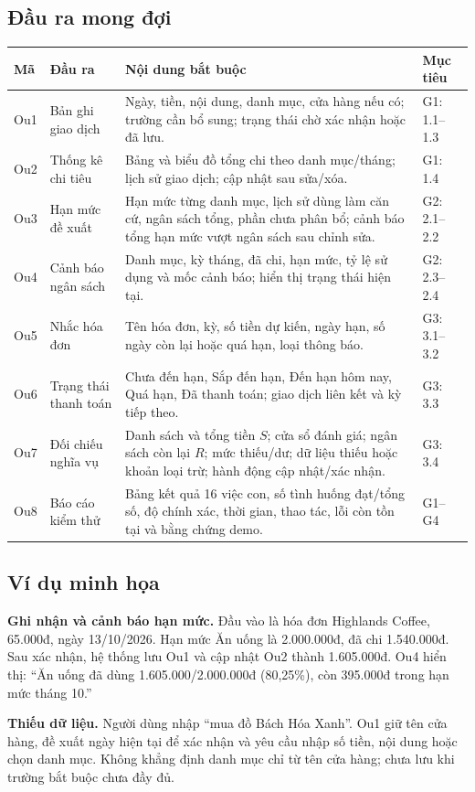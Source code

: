 \documentclass[11pt,a4paper]{article}
\newcommand{\thead}[1]{\rowcolor{tablehead}#1\\\midrule}
\begin{document}
\subsection{Đầu ra mong đợi}
\begin{longtable}{@{}P{.85cm}P{3.1cm}P{8.3cm}P{2.85cm}@{}}
\toprule\thead{\textbf{Mã}&\textbf{Đầu ra}&\textbf{Nội dung bắt buộc}&\textbf{Mục tiêu}}
\endhead
Ou1&Bản ghi giao dịch&Ngày, tiền, nội dung, danh mục, cửa hàng nếu có; trường cần bổ sung; trạng thái chờ xác nhận hoặc đã lưu.&G1: 1.1--1.3\\\midrule
Ou2&Thống kê chi tiêu&Bảng và biểu đồ tổng chi theo danh mục/tháng; lịch sử giao dịch; cập nhật sau sửa/xóa.&G1: 1.4\\\midrule
Ou3&Hạn mức đề xuất&Hạn mức từng danh mục, lịch sử dùng làm căn cứ, ngân sách tổng, phần chưa phân bổ; cảnh báo tổng hạn mức vượt ngân sách sau chỉnh sửa.&G2: 2.1--2.2\\\midrule
Ou4&Cảnh báo ngân sách&Danh mục, kỳ tháng, đã chi, hạn mức, tỷ lệ sử dụng và mốc cảnh báo; hiển thị trạng thái hiện tại.&G2: 2.3--2.4\\\midrule
Ou5&Nhắc hóa đơn&Tên hóa đơn, kỳ, số tiền dự kiến, ngày hạn, số ngày còn lại hoặc quá hạn, loại thông báo.&G3: 3.1--3.2\\\midrule
Ou6&Trạng thái thanh toán&Chưa đến hạn, Sắp đến hạn, Đến hạn hôm nay, Quá hạn, Đã thanh toán; giao dịch liên kết và kỳ tiếp theo.&G3: 3.3\\\midrule
Ou7&Đối chiếu nghĩa vụ&Danh sách và tổng tiền $S$; cửa sổ đánh giá; ngân sách còn lại $R$; mức thiếu/dư; dữ liệu thiếu hoặc khoản loại trừ; hành động cập nhật/xác nhận.&G3: 3.4\\\midrule
Ou8&Báo cáo kiểm thử&Bảng kết quả 16 việc con, số tình huống đạt/tổng số, độ chính xác, thời gian, thao tác, lỗi còn tồn tại và bằng chứng demo.&G1--G4\\\bottomrule
\end{longtable}

\subsection{Ví dụ minh họa}
\textbf{Ghi nhận và cảnh báo hạn mức.} Đầu vào là hóa đơn Highlands Coffee, 65.000đ, ngày 13/10/2026. Hạn mức Ăn uống là 2.000.000đ, đã chi 1.540.000đ. Sau xác nhận, hệ thống lưu Ou1 và cập nhật Ou2 thành 1.605.000đ. Ou4 hiển thị: ``Ăn uống đã dùng 1.605.000/2.000.000đ (80,25\%), còn 395.000đ trong hạn mức tháng 10.''

\textbf{Thiếu dữ liệu.} Người dùng nhập ``mua đồ Bách Hóa Xanh''. Ou1 giữ tên cửa hàng, đề xuất ngày hiện tại để xác nhận và yêu cầu nhập số tiền, nội dung hoặc chọn danh mục. Không khẳng định danh mục chỉ từ tên cửa hàng; chưa lưu khi trường bắt buộc chưa đầy đủ.
\end{document}
